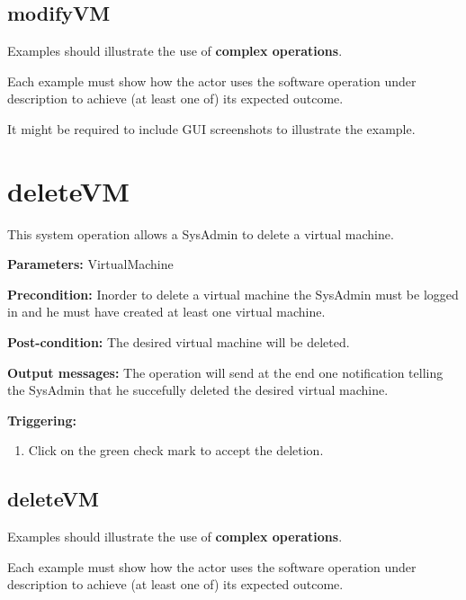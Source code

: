  
\subsection{modifyVM}
Examples should illustrate the use of \textbf{complex operations}.

Each example must show how the actor uses the software operation under
description to achieve (at least one of) its expected outcome.

It might be required to include GUI screenshots to illustrate the example.












\section{deleteVM}
\label{operation:deleteVM}
This system operation allows a SysAdmin to delete a virtual machine. 
\begin{description}

\item \textbf{Parameters:} VirtualMachine
\item \textbf{Precondition:} Inorder to delete a virtual machine the SysAdmin
must be logged in and he must have created at least one virtual machine.
\item \textbf{Post-condition:} The desired virtual machine will be deleted.
\item \textbf{Output messages:} The operation will send at the end one
notification telling the SysAdmin that he succefully deleted the desired
virtual machine.

\item \textbf{Triggering:}
\begin{enumerate}
\item Click on the green check mark to accept the deletion.
\end{enumerate}

 
\end{description}

 
\subsection{deleteVM}
Examples should illustrate the use of \textbf{complex operations}.

Each example must show how the actor uses the software operation under
description to achieve (at least one of) its expected outcome.

